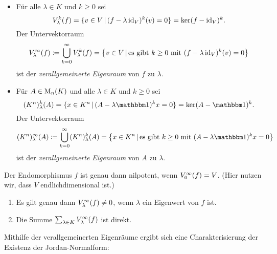 \begin{definition}
  \leavevmode
  \begin{itemize}
    \item
      Für alle $\lambda \in K$ und $k \geq 0$ sei
      \[
          \heigenspace{V}{f}{\lambda}{k}
        = \{ v \in V \suchthat (f - \lambda \id_V)^k(v) = 0 \}
        = \ker (f - \id_V)^k.
      \]
      Der Untervektorraum
      \[
                  \geigenspace{V}{f}{\lambda}
        \coloneqq \bigcup_{k=0}^\infty \heigenspace{V}{f}{\lambda}{k}
        =         \left\{
                    v \in V
                  \suchthat
                    \text{es gibt $k \geq 0$ mit $(f - \lambda \id_V)^k(v) = 0$}
                  \right\}
      \]
      ist der \emph{verallgemeinerte Eigenraum} von $f$ zu $\lambda$.
    \item
      Für $A \in \matrices{n}{K}$ und alle $\lambda \in K$ und $k \geq 0$ sei
      \[
          \heigenspace{(K^n)}{A}{\lambda}{k}
        = \{ x \in K^n \suchthat (A - \lambda \Id)^k x = 0 \}
        = \ker (A - \Id)^k.
      \]
      Der Untervektorraum
      \[
                  \geigenspace{(K^n)}{A}{\lambda}
        \coloneqq \bigcup_{k=0}^\infty \heigenspace{(K^n)}{A}{\lambda}{k}
        =         \left\{
                    x \in K^n
                  \suchthat
                    \text{es gibt $k \geq 0$ mit $(A - \lambda \Id)^k x = 0$}
                  \right\}
      \]
      ist der \emph{verallgemeinerte Eigenraum} von $A$ zu $\lambda$.
  \end{itemize}
\end{definition}

\begin{example}
  Der Endomorphismus $f$ ist genau dann nilpotent, wenn $\geigenspace{V}{f}{0} = V$.
  (Hier nutzen wir, dass $V$ endlichdimensional ist.)
\end{example}

\begin{lemma}
  \leavevmode
  \begin{enumerate}
    \item
      Es gilt genau dann $\geigenspace{V}{f}{\lambda} \neq 0$, wenn $\lambda$ ein Eigenwert von $f$ ist.
    \item
      Die Summe $\sum_{\lambda \in K} \geigenspace{V}{f}{\lambda}$ ist direkt.
  \end{enumerate}
\end{lemma}

Mithilfe der verallgemeinerten Eigenräume ergibt sich eine Charakterisierung der Existenz der Jordan-Normalform:

